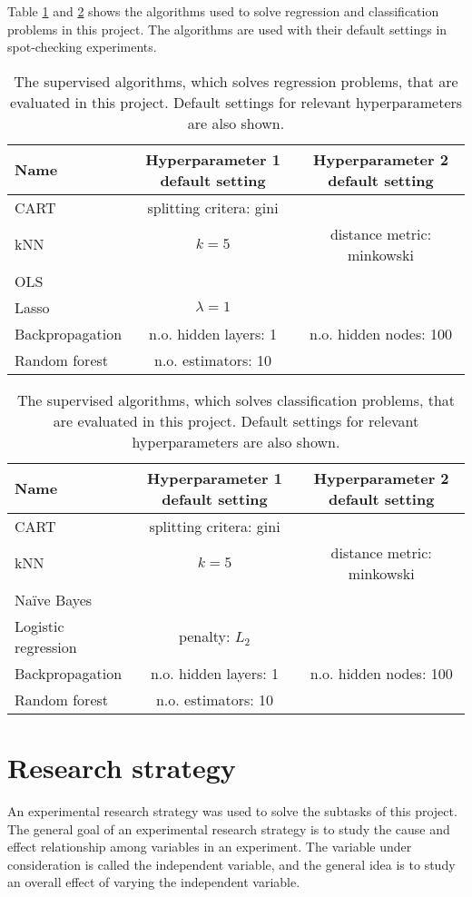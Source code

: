 	Table \ref{table:evaluated_algorithms_regression} and \ref{table:evaluated_algorithms_classification} shows the algorithms used to solve regression and classification problems in this project. The algorithms are used with their default settings in spot-checking experiments.
	\begin{table}[H]
		\centering
		\caption{The supervised algorithms, which solves regression problems, that are evaluated in this project. Default settings for relevant hyperparameters are also shown.}
		\begin{tabular}[3]{l | c | c }
    			Name & Hyperparameter 1 default setting & Hyperparameter 2 default setting \\ 
			 \hline
			CART & splitting critera: gini &  \\ \hline
			kNN & $k = 5$ & distance metric: minkowski \\ \hline
			OLS &  & \\ \hline
			Lasso & $\lambda = 1$ & \\ \hline
			Backpropagation & n.o. hidden layers: 1 & n.o. hidden nodes: 100 \\ \hline
			Random forest & n.o. estimators: 10 &   
			\label{table:evaluated_algorithms_regression}
		\end{tabular}
	\end{table}

	\begin{table}[H]
		\centering
		\caption{The supervised algorithms, which solves classification problems, that are evaluated in this project. Default settings for relevant hyperparameters are also shown.}
		\begin{tabular}[3]{l | c | c }
    			Name & Hyperparameter 1 default setting & Hyperparameter 2 default setting \\ 
			 \hline
			CART & splitting critera: gini &  \\ \hline
			kNN & $k = 5$ & distance metric: minkowski \\ \hline
			Naïve Bayes &  & \\ \hline
			Logistic regression & penalty: $L_2$ & \\ \hline
			Backpropagation & n.o. hidden layers: 1 & n.o. hidden nodes: 100 \\ \hline
			Random forest & n.o. estimators: 10 &   
			\label{table:evaluated_algorithms_classification}
		\end{tabular}
	\end{table}


\section{Research strategy}
	An experimental research strategy was used to solve the subtasks of this project. The general goal of an experimental research strategy is to study the cause and effect relationship among variables in an experiment. The variable under consideration is called the independent variable, and the general idea is to study an overall effect of varying the independent variable.  


